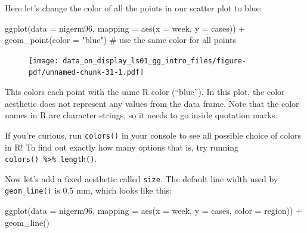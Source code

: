 \documentclass[
  letterpaper,
  DIV=11,
  numbers=noendperiod]{scrreprt}
\newenvironment{Shaded}{\begin{snugshade}}{\end{snugshade}}
\newcommand{\AttributeTok}[1]{\textcolor[rgb]{0.40,0.45,0.13}{#1}}
\newcommand{\CommentTok}[1]{\textcolor[rgb]{0.37,0.37,0.37}{#1}}
\newcommand{\FunctionTok}[1]{\textcolor[rgb]{0.28,0.35,0.67}{#1}}
\newcommand{\NormalTok}[1]{\textcolor[rgb]{0.00,0.23,0.31}{#1}}
\newcommand{\SpecialCharTok}[1]{\textcolor[rgb]{0.37,0.37,0.37}{#1}}
\newcommand{\StringTok}[1]{\textcolor[rgb]{0.13,0.47,0.30}{#1}}
\begin{document}
Here let's change the color of all the points in our scatter plot to
blue:

\begin{Shaded}
\begin{Highlighting}[]
\FunctionTok{ggplot}\NormalTok{(}\AttributeTok{data =}\NormalTok{ nigerm96, }
       \AttributeTok{mapping =} \FunctionTok{aes}\NormalTok{(}\AttributeTok{x =}\NormalTok{ week, }
                     \AttributeTok{y =}\NormalTok{ cases)) }\SpecialCharTok{+}
  \FunctionTok{geom\_point}\NormalTok{(}\AttributeTok{color =} \StringTok{"blue"}\NormalTok{)        }\CommentTok{\# use the same color for all points}
\end{Highlighting}
\end{Shaded}

\begin{figure}[H]

{\centering \texttt{[image: data\_on\_display\_ls01\_gg\_intro\_files/figure-pdf/unnamed-chunk-31-1.pdf]}

}

\end{figure}

This colors each point with the same R color (``blue''). In this plot,
the color aesthetic does not represent any values from the data frame.
Note that the color names in R are character strings, so it needs to go
inside quotation marks.

\begin{tcolorbox}[enhanced jigsaw, colframe=quarto-callout-note-color-frame, rightrule=.15mm, opacityback=0, breakable, coltitle=black, colbacktitle=quarto-callout-note-color!10!white, bottomrule=.15mm, leftrule=.75mm, toprule=.15mm, arc=.35mm, bottomtitle=1mm, colback=white, left=2mm, opacitybacktitle=0.6, titlerule=0mm, title=\textcolor{quarto-callout-note-color}{\faInfo}\hspace{0.5em}{Side Note}, toptitle=1mm]

If you're curious, run \texttt{colors()} in your console to see all
possible choice of colors in R! To find out exactly how many options
that is, try running \texttt{colors()\ \%\textgreater{}\%\ length()}.

\end{tcolorbox}

Now let's add a fixed aesthetic called \texttt{size}. The default line
width used by \texttt{geom\_line()} is 0.5 mm, which looks like this:

\begin{Shaded}
\begin{Highlighting}[]
\FunctionTok{ggplot}\NormalTok{(}\AttributeTok{data =}\NormalTok{ nigerm96, }
             \AttributeTok{mapping =} \FunctionTok{aes}\NormalTok{(}\AttributeTok{x =}\NormalTok{ week, }
                           \AttributeTok{y =}\NormalTok{ cases,}
                           \AttributeTok{color =}\NormalTok{ region)) }\SpecialCharTok{+} 
      \FunctionTok{geom\_line}\NormalTok{()}
\end{Highlighting}
\end{Shaded}
\end{document}
